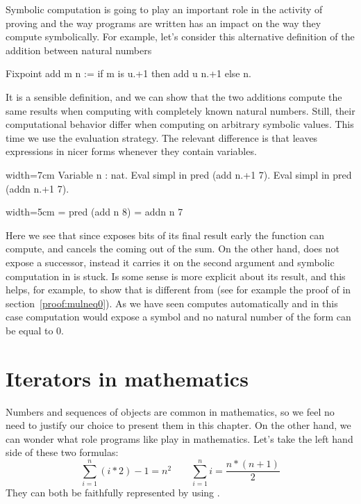 Symbolic computation  is going to play an important role in the activity
of proving
and the way programs are written has an impact on the way they
compute symbolically.  For example, let's consider this alternative
definition of the addition between natural numbers

\begin{coq}{}{}
Fixpoint add m n := if m is u.+1 then add u n.+1 else n.
\end{coq}

It is a sensible definition, and we can show that the two additions
compute the same results when computing with completely known natural
numbers.  Still, their computational behavior differ when computing on
arbitrary symbolic values.
This time we use the  evaluation strategy.  The relevant difference
is that  leaves expressions in nicer forms whenever they contain
variables.

\begin{coq}{}{width=7cm}
Variable n : nat.
Eval simpl in pred (add n.+1 7).
Eval simpl in pred (addn n.+1 7).
\end{coq}
\begin{coqout}{}{width=5cm}
= pred (add n 8)
= addn n 7
\end{coqout}

Here we see that since  exposes bits of its
final result early the  function can compute, and cancels
the  coming out of the sum.  On the other hand,
 does not expose a successor, instead it carries it on the second
argument and symbolic computation in  is stuck.
Is some sense  is more
explicit about its result, and this helps, for example, to show that
 is different from  (see for example
the proof of  in section~\ref{proof:mulneq0}).
As we have seen \Coq{} computes
automatically and in this case computation would expose a  symbol
and no natural number of the form  can be equal to 0.

\section{Iterators in mathematics}
\label{sec:bigopnat}

Numbers and sequences of objects are common in mathematics, so we feel
no need to justify our choice to present them in this chapter.
On the other hand, we can wonder what role programs like 
play in mathematics.
Let's take the left hand side of these two formulas:
$$
\sum_{i=1}^n (i * 2) - 1 = n ^ 2 \qquad
\sum_{i=1}^n i = \frac{n * (n + 1)}{2}
$$
They can both be faithfully represented by using .

